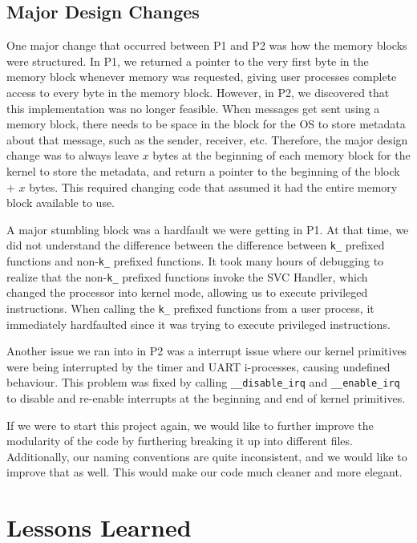 \documentclass[12pt]{report}
\begin{document}
\section{Major Design Changes}

One major change that occurred between P1 and P2 was how the memory blocks were structured. In P1, we returned a pointer to the very first byte in the memory block whenever memory was requested, giving user processes complete access to every byte in the memory block. However, in P2, we discovered that this implementation was no longer feasible. When messages get sent using a memory block, there needs to be space in the block for the OS to store metadata about that message, such as the sender, receiver, etc. Therefore, the major design change was to always leave $x$ bytes at the beginning of each memory block for the kernel to store the metadata, and return a pointer to the beginning of the block + $x$ bytes. This required changing code that assumed it had the entire memory block available to use.

A major stumbling block was a hardfault we were getting in P1. At that time, we did not understand the difference between the difference between \texttt{k_} prefixed functions and non-\texttt{k_} prefixed functions. It took many hours of debugging to realize that the non-\texttt{k_} prefixed functions invoke the SVC Handler, which changed the processor into kernel mode, allowing us to execute privileged instructions. When calling the \texttt{k_} prefixed functions from a user process, it immediately hardfaulted since it was trying to execute privileged instructions.

Another issue we ran into in P2 was a interrupt issue where our kernel primitives were being interrupted by the timer and UART i-processes, causing undefined behaviour. This problem was fixed by calling \texttt{__disable_irq} and \texttt{__enable_irq} to disable and re-enable interrupts at the beginning and end of kernel primitives.


If we were to start this project again, we would like to further improve the modularity of the code by furthering breaking it up into different files. Additionally, our naming conventions are quite inconsistent, and we would like to improve that as well. This would make our code much cleaner and more elegant. 

\chapter{Lessons Learned}
\end{document}
